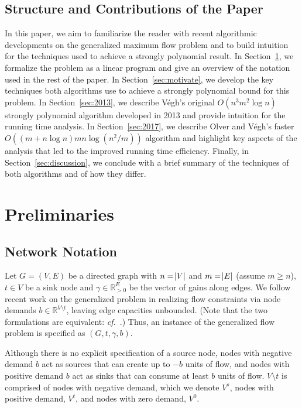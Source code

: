 \documentclass[11pt]{article}
\theoremstyle{definition}
\theoremstyle{definition}
\theoremstyle{definition}
\newcommand{\R}{\mathbb{R}}
\newcommand{\vsrc}{V^{s}}
\newcommand{\vsink}{V^{t}}
\newcommand{\vz}{V^{0}}
\begin{document}
	\subsection{Structure and Contributions of the Paper}\label{sec:structure}
	In this paper, we aim to
	familiarize the reader with recent algorithmic developments on the
	generalized maximum flow problem and to build intuition for the techniques
	used to achieve a strongly polynomial result. In Section~\ref{sec:prelim}, we formalize
    the problem as a linear program and give an overview of the notation
	used in the rest of the paper. In Section~\ref{sec:motivate}, we develop the key techniques
	both algorithms use to achieve a strongly polynomial bound for this
	problem. In Section~\ref{sec:2013}, we describe Végh's original $O(n^3m^2 \log n)$ strongly
	polynomial algorithm developed in 2013 and provide intuition for the running
	time analysis. 
	In Section~\ref{sec:2017}, we describe Olver and
	Végh's faster $O((m + n\log n)mn\log(n^2 / m))$ algorithm and highlight key
	aspects of the analysis that led to the improved running time efficiency.
	Finally, in Section~\ref{sec:discussion}, we conclude with a brief summary of
    the techniques of both algorithms and of how they differ.
    
\section{Preliminaries}\label{sec:prelim}

	\subsection{Network Notation}\label{sec:notation}
	Let $G=(V,E)$ be a directed graph with $n=\abs{V}$ and $m=\abs{E}$ (assume
	$m \geq n$), $t \in V$ be a sink node and $\gamma \in \R_{>0}^E$ be the vector of gains
	along edges. We follow recent work on the generalized problem in realizing flow
	constraints via node demands $b \in \R^{V \setminus t}$, leaving
	edge capacities unbounded. (Note that the two formulations are equivalent:
    \emph{cf.}~\cite{Vegh2013}.)
    Thus, an instance of the generalized flow problem
	is specified as $(G, t, \gamma, b)$.

	Although there is no explicit specification of a source node,
    nodes with negative demand $b$ act as sources that can create
	up to $-b$ units of flow, and nodes with positive demand $b$ act as sinks 
	that can consume at least $b$ units of flow. 
	$V \setminus t$ is comprised of
	nodes with negative demand, which we denote $\vsrc$, nodes with positive
	demand, $\vsink$, and nodes with zero demand, $\vz$.
\end{document}

